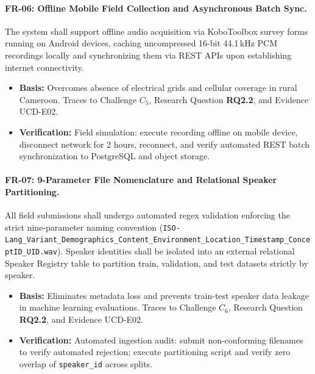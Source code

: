 \documentclass[conference]{IEEEtran}
\begin{document}
\paragraph{FR-06: Offline Mobile Field Collection and Asynchronous Batch Sync.}
The system shall support offline audio acquisition via KoboToolbox survey forms running on Android devices, caching uncompressed 16-bit 44.1\,kHz PCM recordings locally and synchronizing them via REST APIs upon establishing internet connectivity.
\begin{itemize}
    \item \textbf{Basis:} Overcomes absence of electrical grids and cellular coverage in rural Cameroon. Traces to Challenge $C_5$, Research Question \textbf{RQ2.2}, and Evidence UCD-E02.
    \item \textbf{Verification:} Field simulation: execute recording offline on mobile device, disconnect network for 2 hours, reconnect, and verify automated REST batch synchronization to PostgreSQL and object storage.
\end{itemize}

\paragraph{FR-07: 9-Parameter File Nomenclature and Relational Speaker Partitioning.}
All field submissions shall undergo automated regex validation enforcing the strict nine-parameter naming convention (\texttt{ISO-Lang\_}\allowbreak\texttt{Variant\_}\allowbreak\texttt{Demographics\_}\allowbreak\texttt{Content\_}\allowbreak\texttt{Environment\_}\allowbreak\texttt{Location\_}\allowbreak\texttt{Timestamp\_}\allowbreak\texttt{ConceptID\_}\allowbreak\texttt{UID.wav}). Speaker identities shall be isolated into an external relational Speaker Registry table to partition train, validation, and test datasets strictly by speaker.
\begin{itemize}
    \item \textbf{Basis:} Eliminates metadata loss and prevents train-test speaker data leakage in machine learning evaluations. Traces to Challenge $C_6$, Research Question \textbf{RQ2.2}, and Evidence UCD-E02.
    \item \textbf{Verification:} Automated ingestion audit: submit non-conforming filenames to verify automated rejection; execute partitioning script and verify zero overlap of \texttt{speaker\_id} across splits.
\end{itemize}
\end{document}

